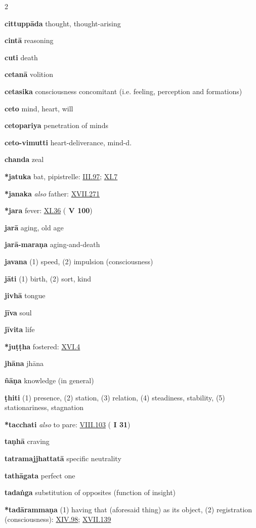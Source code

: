 \begin{multicols}{2}
\begin{vismHanging}
\par\textbf{cittuppāda} thought, thought-arising
\par\textbf{cintā} reasoning 
\par\textbf{cuti} death 
\par\textbf{cetanā} volition
\par\textbf{cetasika} consciousness concomitant (i.e. feeling, perception and formations) 
\par\textbf{ceto} mind, heart, will
\par\textbf{cetopariya} penetration of minds
\par\textbf{ceto-vimutti} heart-deliverance, mind-d.
\par\textbf{chanda} zeal 
\par\textbf{*jatuka} bat, pipistrelle: \hyperlink{III.97}{III.97}{}; \hyperlink{XI.7}{XI.7}{} 
\par\textbf{*janaka} \emph{also }father: \hyperlink{XVII.271}{XVII.271}{}
\par\textbf{*jara} fever: \hyperlink{XI.36}{XI.36}{} (\textbf{\cite{A} V 100})
\par\textbf{jarā} aging, old age
\par\textbf{jarā-maraṇa} aging-and-death
\par\textbf{javana} (1) speed, (2) impulsion (consciousness) 
\par\textbf{jāti} (1) birth, (2) sort, kind
\par\textbf{jivhā} tongue
\par\textbf{jīva} soul
\par\textbf{jīvita} life
\par\textbf{*juṭṭha} fostered: \hyperlink{XVI.4}{XVI.4}{}
\par\textbf{jhāna} jhāna
\par\textbf{ñāṇa} knowledge (in general)
\par\textbf{ṭhiti} (1) presence, (2) station, (3) relation, (4) steadiness, stability, (5) stationariness, stagnation 
\par\textbf{*tacchati} \emph{also }to pare: \hyperlink{VIII.103}{VIII.103}{} (\textbf{\cite{M} I 31})
\par\textbf{taṇhā} craving
\par\textbf{tatramajjhattatā} specific neutrality
\par\textbf{tathāgata} perfect one
\par\textbf{tadaṅga} substitution of opposites (function of insight) 
\par\textbf{*tadārammaṇa} (1) having that (aforesaid thing) as its object, (2) registration (consciousness): \hyperlink{XIV.98}{XIV.98}{}; \hyperlink{XVII.139}{XVII.139}{} 

\end{vismHanging}
\end{multicols}
